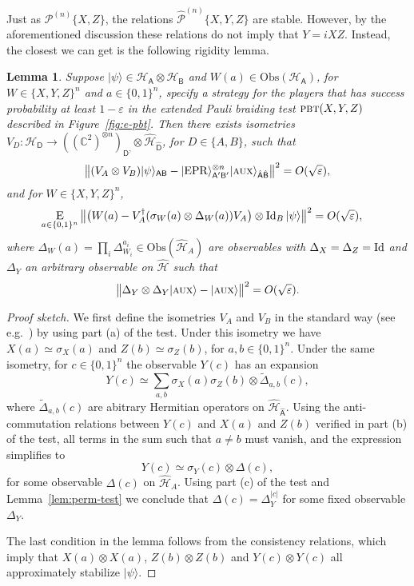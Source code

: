 \documentclass[11pt]{article}
\newtheorem{lemma}[theorem]{Lemma}
\theoremstyle{remark}
\theoremstyle{definition}
\newcommand{\ket}[1]{|#1\rangle}
\newcommand{\Id}{\ensuremath{\mathop{\rm Id}\nolimits}}
\newcommand{\Es}[1]{\ensuremath{\mathop{\textsc{E}}_{#1}}}
\newcommand{\reg}[1]{{\textsf{#1}}}
\newcommand{\C}{\ensuremath{\mathbb{C}}}
\newcommand{\mH}{\mathcal{H}}
\newcommand{\setft}[1]{\mathrm{#1}}
\newcommand{\Obs}{\setft{Obs}}
\newcommand{\eps}{\varepsilon}
\newcommand{\EPR}{{\rm EPR}}
\newcommand{\pbt}{\textsc{pbt}}
\newcommand{\aux}{\textsc {aux}}
\newcommand{\epaulin}{\hat{\mathcal{P}}^{(n)}\!}
\newcommand{\paulin}{\mathcal{P}^{(n)}\!}
\begin{document}
Just as $\paulin\{X,Z\}$, the relations $\epaulin\{X,Y,Z\}$ are stable. However, by the aforementioned discussion these relations do not imply that $Y= iXZ$. Instead, the closest we can get is the following rigidity lemma. 

\begin{lemma}\label{lem:xyz-rigid}
Suppose $\ket{\psi}\in\mH_\reg{A}\otimes \mH_\reg{B}$ and $W(a) \in \Obs(\mH_\reg{A})$, for $W\in \{X,Y,Z\}^n$ and $a\in\{0,1\}^n$, specify a strategy for the players that has success probability at least $1-\eps$ in the extended Pauli braiding test $\pbt(X,Y,Z)$ described in Figure~\ref{fig:e-pbt}. 
Then there exists isometries $V_D:\mH_\reg{D} \to ((\C^2)^{\otimes n})_{\reg{D'}}  \otimes \hat{\mH}_{\hat{\reg{D}}}$, for $D\in\{A,B\}$, such that
$$\big\| (V_A \otimes V_B) \ket{\psi}_{\reg{AB}} - \ket{\EPR}_{\reg{A}'\reg{B}'}^{\otimes n} \ket{\aux}_{\hat{\reg{A}}\hat{\reg{B}}} \big\|^2 = O(\sqrt{\eps}),$$
and for $W\in \{X,Y,Z\}^n$,
\begin{align}\label{eq:test-sigmay}
 \Es{a\in\{0,1\}^n} \big\| \big(W(a) -V_A^\dagger (\sigma_W(a) \otimes \Delta_W(a)) V_A\big) \otimes \Id_B \ket{\psi} \big\|^2 &= O(\sqrt{\eps}),
\end{align}
where $\Delta_W(a) = \prod_i \Delta_{W_i}^{a_i} \in \Obs(\hat{\mH}_A)$ are observables with $\Delta_{X}=\Delta_{Z}=\Id$ and $\Delta_{Y}$ an arbitrary observable on $\hat{\mH}$ such that
	$$ \big\|\Delta_Y \otimes \Delta_Y \ket{\aux} - \ket{\aux} \big\|^2 = O(\sqrt{\eps}).$$
\end{lemma}

\begin{proof}[Proof sketch]
We first define the isometries $V_A$ and $V_B$ in the standard way (see e.g.~\cite[Theorem 2.3]{chao2017overlapping}) by using part (a) of the test. Under this isometry we have $X(a) \simeq \sigma_X(a)$ and $Z(b)\simeq \sigma_Z(b)$, for $a,b\in\{0,1\}^n$. Under the same isometry, for $c\in\{0,1\}^n$ the observable $Y(c)$ has an expansion 
$$ Y(c) \simeq \sum_{a,b} \sigma_X(a)\sigma_Z(b) \otimes \tilde{\Delta}_{a,b}(c),$$
where $\tilde{\Delta}_{a,b}(c)$ are abitrary Hermitian operators on $\hat{\mH}_{\hat{\reg{A}}}$. Using the 
 anti-commutation relations between $Y(c)$ and $X(a)$ and $Z(b)$ verified in part (b) of the test, all terms in the sum such that $a\neq b$ must vanish, and the expression simplifies to 
$$ Y(c) \simeq \sigma_Y(c) \otimes {\Delta}(c),$$
for some observable ${\Delta}(c)$ on $\hat{\mH}_A$. Using part (c) of the test and Lemma~\ref{lem:perm-test} we conclude that $\Delta(c) = \Delta_Y^{|c|}$ for some fixed observable $\Delta_Y$. 

The last condition in the lemma follows from the consistency relations, which imply that $X(a)\otimes X(a)$, $Z(b)\otimes Z(b)$ and $Y(c)\otimes Y(c)$ all approximately stabilize $\ket{\psi}$. 
\end{proof}
\end{document}
